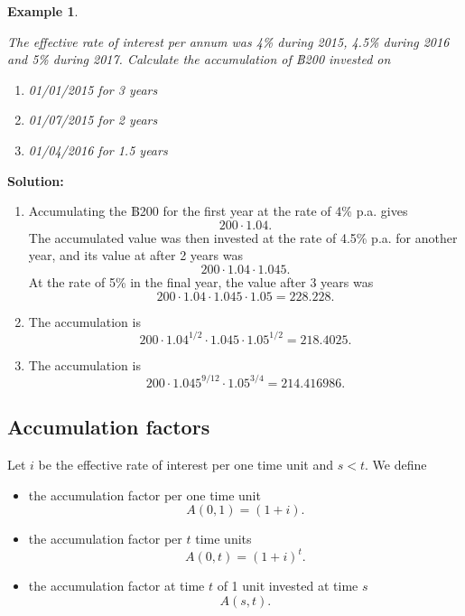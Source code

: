 \documentclass[landscape, 20pt]{extreport}
\theoremstyle{definition}
\theoremstyle{definition}
\newtheorem{example}{Example}[chapter]
\theoremstyle{definition}
\theoremstyle{definition}
\theoremstyle{remark}
\begin{document}
\newpage \begin{example}
\protect\hypertarget{exm:unlabeled-div-12}{}\label{exm:unlabeled-div-12}

\emph{The effective rate of interest per annum was 4\%
during 2015, 4.5\% during 2016 and 5\% during 2017. Calculate the
accumulation of ฿200 invested on}

\begin{enumerate}
\def\labelenumi{\arabic{enumi}.}
\item
  \emph{01/01/2015 for 3 years}
\item
  \emph{01/07/2015 for 2 years}
\item
  \emph{01/04/2016 for 1.5 years}
\end{enumerate}

\end{example}

\textbf{Solution:}

\begin{enumerate}
\def\labelenumi{\arabic{enumi}.}
\item
  Accumulating the ฿200 for the first year at the rate of 4\% p.a.
  gives \[200 \cdot 1.04.\] The accumulated value was then invested at
  the rate of 4.5\% p.a. for another year, and its value at after 2
  years was \[200 \cdot 1.04 \cdot 1.045.\] At the rate of 5\% in the
  final year, the value after 3 years was
  \[200 \cdot 1.04 \cdot 1.045 \cdot 1.05 = 228.228.\]
\item
  The accumulation is
  \[200 \cdot 1.04^{1/2} \cdot 1.045 \cdot 1.05^{1/2} = 218.4025.\]
\item
  The accumulation is
  \[200 \cdot 1.045^{9/12} \cdot 1.05^{3/4} = 214.416986.\]
\end{enumerate}

\hypertarget{accumulation-factors}{%
\subsection{Accumulation factors}\label{accumulation-factors}}

Let \(i\) be the effective rate of interest per one time unit and \(s < t\).
We define

\begin{itemize}
\item
  the accumulation factor per one time unit \[A(0,1) = (1 + i).\]
\item
  the accumulation factor per \(t\) time units \[A(0,t) = (1 + i)^t.\]
\item
  the accumulation factor at time \(t\) of 1 unit invested at time \(s\)
  \[A(s,t).\]
\end{itemize}
\end{document}
